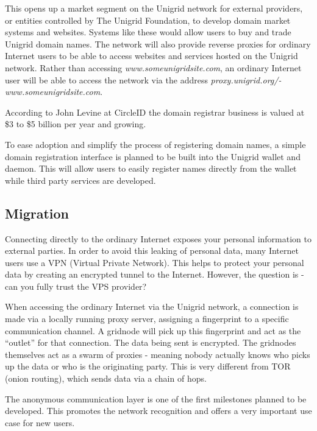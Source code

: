 \documentclass{article}
\begin{document}
This opens up a market segment on the Unigrid network for external providers, or entities controlled by The Unigrid Foundation, to develop domain market systems and websites. Systems like these would allow users to buy and trade Unigrid domain names. The network will also provide reverse proxies for ordinary Internet users to be able to access websites and services hosted on the Unigrid network. Rather than accessing \emph{www.someunigridsite.com}, an ordinary Internet user will be able to access the network via the address \emph{proxy.unigrid.org/- www.someunigridsite.com}.

According to John Levine at CircleID \cite{john2018} the domain registrar business is valued at \$3 to \$5 billion per year and growing.

To ease adoption and simplify the process of registering domain names, a simple domain registration interface is planned to be built into the Unigrid wallet and daemon. This will allow users to easily register names directly from the wallet while third party services are developed.

\subsection{Migration}
Connecting directly to the ordinary Internet exposes your personal information to external parties. In order to avoid this leaking of personal data, many Internet users use a VPN (Virtual Private Network). This helps to protect your personal data by creating an encrypted tunnel to the Internet. However, the question is - can you fully trust the VPS provider?

When accessing the ordinary Internet via the Unigrid network, a connection is made via a locally running proxy server, assigning a fingerprint to a specific communication channel. A gridnode will pick up this fingerprint and act as the “outlet” for that connection. The data being sent is encrypted. The gridnodes themselves act as a swarm of proxies - meaning nobody actually knows who picks up the data or who is the originating party. This is very different from TOR (onion routing), which sends data via a chain of hops.

The anonymous communication layer is one of the first milestones planned to be developed. This promotes the network recognition and offers a very important use case for new users.
\end{document}

